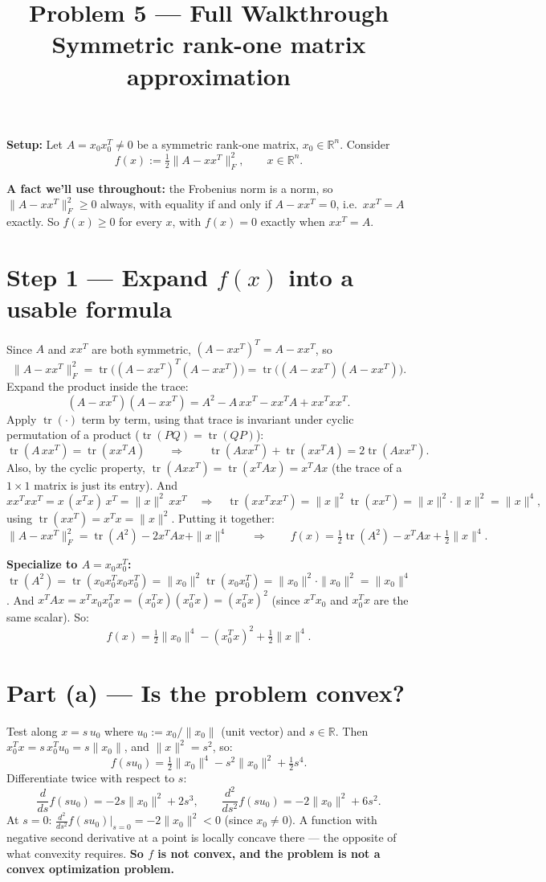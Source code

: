 \documentclass[11pt]{article}
\title{Problem 5 --- Full Walkthrough\\ \large Symmetric rank-one matrix approximation}
\author{}
\date{}
\newcommand{\R}{\mathbb{R}}
\newcommand{\tr}{\operatorname{tr}}
\begin{document}
\maketitle

\textbf{Setup:} Let $A = x_0x_0^T \ne 0$ be a symmetric rank-one matrix, $x_0\in\R^n$. Consider
\[
f(x) := \tfrac12\|A-xx^T\|_F^2, \qquad x\in\R^n.
\]

\textbf{A fact we'll use throughout:} the Frobenius norm is a norm, so $\|A-xx^T\|_F^2 \ge 0$ always, with equality if and only if $A-xx^T=0$, i.e.\ $xx^T=A$ exactly. So $f(x)\ge0$ for every $x$, with $f(x)=0$ exactly when $xx^T=A$.

\section*{Step 1 --- Expand $f(x)$ into a usable formula}

Since $A$ and $xx^T$ are both symmetric, $(A-xx^T)^T = A-xx^T$, so
\[
\|A-xx^T\|_F^2 = \tr\big((A-xx^T)^T(A-xx^T)\big) = \tr\big((A-xx^T)(A-xx^T)\big).
\]
Expand the product inside the trace:
\[
(A-xx^T)(A-xx^T) = A^2 - A\,xx^T - xx^T A + xx^Txx^T.
\]
Apply $\tr(\cdot)$ term by term, using that trace is invariant under cyclic permutation of a product ($\tr(PQ)=\tr(QP)$):
\[
\tr(A\,xx^T) = \tr(xx^T A) \qquad\Longrightarrow\qquad \tr(Axx^T)+\tr(xx^TA) = 2\tr(Axx^T).
\]
Also, by the cyclic property, $\tr(Axx^T) = \tr(x^TAx) = x^TAx$ (the trace of a $1\times1$ matrix is just its entry). And
\[
xx^Txx^T = x\,(x^Tx)\,x^T = \|x\|^2\,xx^T \quad\Longrightarrow\quad \tr(xx^Txx^T) = \|x\|^2\tr(xx^T) = \|x\|^2\cdot\|x\|^2 = \|x\|^4,
\]
using $\tr(xx^T)=x^Tx=\|x\|^2$. Putting it together:
\[
\|A-xx^T\|_F^2 = \tr(A^2) - 2x^TAx + \|x\|^4 \qquad\Longrightarrow\qquad f(x) = \tfrac12\tr(A^2) - x^TAx + \tfrac12\|x\|^4.
\]

\textbf{Specialize to $A=x_0x_0^T$:} $\tr(A^2) = \tr(x_0x_0^Tx_0x_0^T) = \|x_0\|^2\tr(x_0x_0^T) = \|x_0\|^2\cdot\|x_0\|^2 = \|x_0\|^4$. And $x^TAx = x^Tx_0x_0^Tx = (x_0^Tx)(x_0^Tx) = (x_0^Tx)^2$ (since $x^Tx_0$ and $x_0^Tx$ are the same scalar). So:
\[
f(x) = \tfrac12\|x_0\|^4 - (x_0^Tx)^2 + \tfrac12\|x\|^4.
\]

\section*{Part (a) --- Is the problem convex?}

Test along $x = s\,u_0$ where $u_0 := x_0/\|x_0\|$ (unit vector) and $s\in\R$. Then $x_0^Tx = s\,x_0^Tu_0 = s\|x_0\|$, and $\|x\|^2=s^2$, so:
\[
f(su_0) = \tfrac12\|x_0\|^4 - s^2\|x_0\|^2 + \tfrac12s^4.
\]
Differentiate twice with respect to $s$:
\[
\frac{d}{ds}f(su_0) = -2s\|x_0\|^2+2s^3, \qquad \frac{d^2}{ds^2}f(su_0) = -2\|x_0\|^2+6s^2.
\]
At $s=0$: $\frac{d^2}{ds^2}f(su_0)\big|_{s=0} = -2\|x_0\|^2 < 0$ (since $x_0\ne0$). A function with negative second derivative at a point is locally concave there --- the opposite of what convexity requires. \textbf{So $f$ is not convex, and the problem is not a convex optimization problem.}
\end{document}
